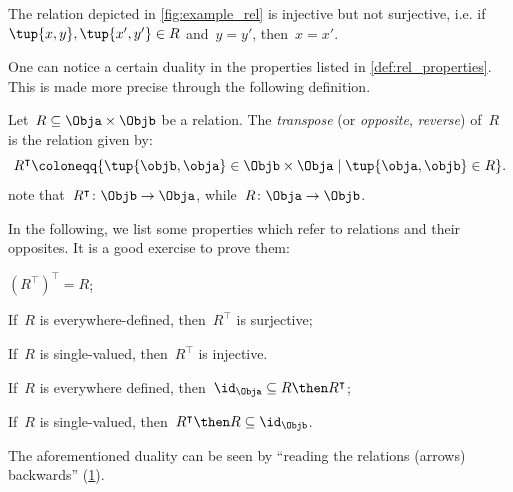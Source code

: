 \begin{example}
    The relation depicted in \cref{fig:example_rel} is injective but not surjective, i.e. if~$\tup{x,y},\tup{x',y'}\in R$ and~$y=y'$, then~$x=x'$.
\end{example}

One can notice a certain duality in the properties listed in \cref{def:rel_properties}. This is made more precise through the following definition.

\begin{definition}\label{def:relation-transpose}
    Let~$R\subseteq \Obja\times \Objb$ be a relation. The \emph{transpose} (or \emph{opposite}, \emph{reverse}) of~$R$ is the relation given by:
    \begin{equation*}
        R^\intercal \coloneqq \{\tup{\objb,\obja}\in \Objb\times \Obja \mid \tup{\obja,\objb}\in R \}.
    \end{equation*}
    note that~$R^\intercal\colon \Objb\to \Obja$, while~$R\colon \Obja\to \Objb$.
\end{definition}
\begin{remark}
    In the following, we list some properties which refer to relations and their opposites. It is a good exercise to prove them:
    \begin{compactitem}
        \item $\left( R^\intercal\right)^\intercal =R$;
        \item If~$R$ is everywhere-defined, then~$R^\intercal$ is surjective;
        \item If~$R$ is single-valued, then~$R^\intercal$ is injective.
        \item If~$R$ is everywhere defined, then~$\id_\Obja\subseteq R\then R^\intercal$;
        \item If~$R$ is single-valued, then~$R^\intercal\then R\subseteq \id_\Objb$.
    \end{compactitem}
\end{remark}

\begin{remark}
    The aforementioned duality can be seen by ``reading the relations (arrows) backwards'' (\cref{fig:rel_transpose}).
\end{remark}

\begin{figure}[h!]
    \centering
    \caption{\label{fig:rel_transpose}}
\end{figure}

